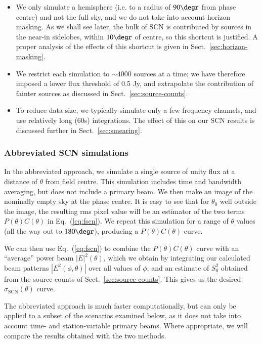 \documentclass{aa}
\begin{document}
\begin{itemize}
  \item We only simulate a hemisphere (i.e. to a radius of $90\degr$ from phase centre) and not the full sky, and we do not take into account horizon masking. As we shall see later, the bulk of SCN is contributed by sources in the near-in sidelobes, within $10\degr$ of centre, so this shortcut is justified. A proper analysis of the effects of this shortcut is given in Sect.~\ref{sec:horizon-masking}.
  \item We restrict each simulation to $\sim4000$ sources at a time; we have therefore imposed a lower flux threshold of 0.5 Jy, and extrapolate the contribution of fainter sources as discussed in Sect.~\ref{sec:source-counts}.
  \item To reduce data size, we typically simulate only a few frequency channels, and use relatively long (60s) integrations. The effect of this on our SCN results is discussed further in Sect.~\ref{sec:smearing}.
\end{itemize}

\subsubsection{Abbreviated SCN simulations}

In the abbreviated approach, we simulate a single source of unity flux at a distance of $\theta$ from field centre. This simulation includes time and bandwidth averaging, but does not include a primary beam. We then make an image of the nominally empty sky at the phase centre. It is easy to see that for $\theta_0$ well outside the image, the resulting rms pixel value will be an estimator of the two terms $P(\theta)C(\theta)$ in Eq.~(\ref{eq:fscn}). We repeat this simulation for a range of $\theta$ values (all the way out to $180\degr$), producing a $P(\theta)C(\theta)$ curve.

We can then use Eq.~(\ref{eq:fscn}) to combine the $P(\theta)C(\theta)$ curve with an ``average'' power beam $|E|^2(\theta)$, which we obtain by integrating our calculated beam patterns $|E^2(\phi,\theta)|$ over all values of $\phi$, and an estimate of $S^2_0$ obtained from the source counts of Sect.~\ref{sec:source-counts}. This gives us the desired $\sigma_\mathrm{SCN}(\theta)$ curve.

The abbreviated approach is much faster computationally, but can only be applied to a subset of the scenarios examined below, as it does not take into account time- and station-variable primary beams. Where appropriate, we will compare the results obtained with the two methods.
 
\end{document}
